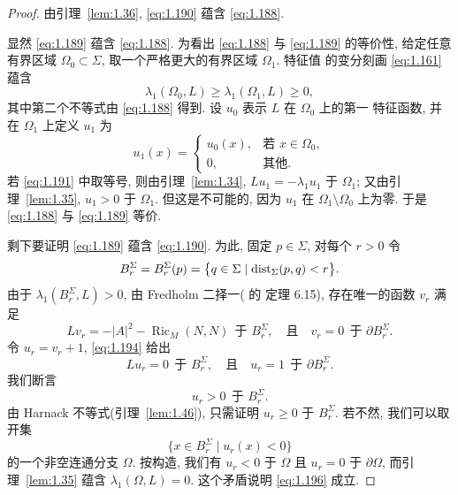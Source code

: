 \begin{proof}
由引理~\ref{lem:1.36}, \eqref{eq:1.190} 蕴含 \eqref{eq:1.188}.

显然 \eqref{eq:1.189} 蕴含 \eqref{eq:1.188}. 为看出 \eqref{eq:1.188} 与 \eqref{eq:1.189} 的等价性, 给定任意
有界区域 $\Omega_0\subset\Sigma$, 取一个严格更大的有界区域 $\Omega_1$. 特征值
的变分刻画 \eqref{eq:1.161} 蕴含
\begin{equation}
\lambda_1(\Omega_0,L)\geq\lambda_1(\Omega_1,L)\geq0,
\label{eq:1.191}
\end{equation}
其中第二个不等式由 \eqref{eq:1.188} 得到. 设 $u_0$ 表示 $L$ 在 $\Omega_0$ 上的第一
特征函数, 并在 $\Omega_1$ 上定义 $u_1$ 为
\begin{equation}
u_1(x)=
\begin{cases}
u_0(x), & \text{若 } x\in\Omega_0,\\
0, & \text{其他}.
\end{cases}
\label{eq:1.192}
\end{equation}
若 \eqref{eq:1.191} 中取等号, 则由引理~\ref{lem:1.34}, $Lu_1=-\lambda_1u_1$ 于
$\Omega_1$; 又由引理~\ref{lem:1.35}, $u_1>0$ 于 $\Omega_1$. 但这是不可能的,
因为 $u_1$ 在 $\Omega_1\setminus\Omega_0$ 上为零. 于是 \eqref{eq:1.188} 与 \eqref{eq:1.189}
等价.

剩下要证明 \eqref{eq:1.189} 蕴含 \eqref{eq:1.190}. 为此, 固定 $p\in\Sigma$, 对每个 $r>0$ 令
\begin{equation}
B_r^{\Sigma}=B_r^{\Sigma}(p)
 =\bigl\{q\in\Sigma\mid\operatorname{dist}_{\Sigma}(p,q)<r\bigr\}.
\label{eq:1.193}
\end{equation}
由于 $\lambda_1(B_r^{\Sigma},L)>0$, 由 Fredholm 二择一(\cite{GiTr} 的
定理 6.15), 存在唯一的函数 $v_r$ 满足
\begin{equation}
Lv_r=-|A|^{2}-\operatorname{Ric}_M(N,N)\ \ \text{于 } B_r^{\Sigma},
\quad\text{且}\quad v_r=0\ \ \text{于 } \partial B_r^{\Sigma}.
\label{eq:1.194}
\end{equation}
令 $u_r=v_r+1$, \eqref{eq:1.194} 给出
\begin{equation}
Lu_r=0\ \ \text{于 } B_r^{\Sigma},
\quad\text{且}\quad u_r=1\ \ \text{于 } \partial B_r^{\Sigma}.
\label{eq:1.195}
\end{equation}
我们断言
\begin{equation}
u_r>0\ \ \text{于 } B_r^{\Sigma}.
\label{eq:1.196}
\end{equation}
由 Harnack 不等式(引理~\ref{lem:1.46}), 只需证明 $u_r\geq0$ 于
$B_r^{\Sigma}$. 若不然, 我们可以取开集
\begin{equation}
\bigl\{x\in B_r^{\Sigma}\mid u_r(x)<0\bigr\}
\label{eq:1.197}
\end{equation}
的一个非空连通分支 $\Omega$. 按构造, 我们有 $u_r<0$ 于 $\Omega$ 且 $u_r=0$
于 $\partial\Omega$, 而引理~\ref{lem:1.35} 蕴含 $\lambda_1(\Omega,L)=0$.
这个矛盾说明 \eqref{eq:1.196} 成立.


\end{proof}
